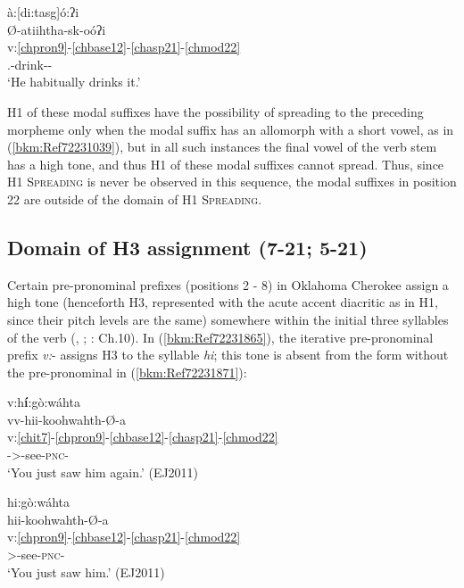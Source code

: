 \documentclass[output=paper]{langscibook}
\begin{document}
\ea\label{bkm:Ref72231072}à:[di:tasg]ó:ʔi \\
\glll Ø-atiihtha-sk-oóʔi\\
v:\ref{chpron9}-\ref{chbase12}-\ref{chasp21}-\ref{chmod22} \\
\Third\Sg.\Aarg{}-drink-\Impf{}-\Hab{}\\
\glt `He habitually drinks it.' \citep[11]{Feeling1975}
\z 
     
H1 of these modal suffixes have the possibility of spreading to the preceding morpheme only when the modal suffix has an allomorph with a short vowel, as in (\ref{bkm:Ref72231039}), but in all such instances the final vowel of the verb stem has a high tone, and thus H1 of these modal suffixes cannot spread. Thus, since H1 \textsc{Spreading} is never be observed in this sequence, the modal suffixes in position 22 are outside of the domain of H1 \textsc{Spreading}. 

\subsection{Domain of H3 assignment ({7}-21; {5}-21)}
\label{bkm:Ref72232692}
Certain pre-pronominal prefixes (positions 2 - 8) in Oklahoma Cherokee assign a high tone (henceforth H3, represented with the acute accent diacritic as in H1, since their pitch levels are the same) somewhere within the initial three syllables of the verb (\citealt{Lindsey1987}, \citealt{Wright1996}; \citealt{uchihara2016tone}: Ch.10). In (\ref{bkm:Ref72231865}), the iterative pre-pronominal prefix \textit{v:}{}- assigns H3 to the syllable \textit{hi}; this tone is absent from the form without the pre-pronominal in (\ref{bkm:Ref72231871}): 

\newpage
\ea\label{bkm:Ref72231865}v:h\textbf{í}:gò:wáhta \\
\glll vv-hii-koohwahth-Ø-a \\
v:\ref{chit7}-\ref{chpron9}-\ref{chbase12}-\ref{chasp21}-\ref{chmod22} \\
\Iter{}-\Second\Sg>\An{}-see-\textsc{pnc}-\Ind{}\\ 
\glt `You just saw him again.' (EJ2011)
\z 

\ea\label{bkm:Ref72231871}hi:gò:wáhta \\
\glll hii-koohwahth-Ø-a\\
v:\ref{chpron9}-\ref{chbase12}-\ref{chasp21}-\ref{chmod22}\\ 
\Second\Sg>\An{}-see-\textsc{pnc}-\Ind{}\\ 
\glt `You just saw him.' (EJ2011)
\z
\end{document}

